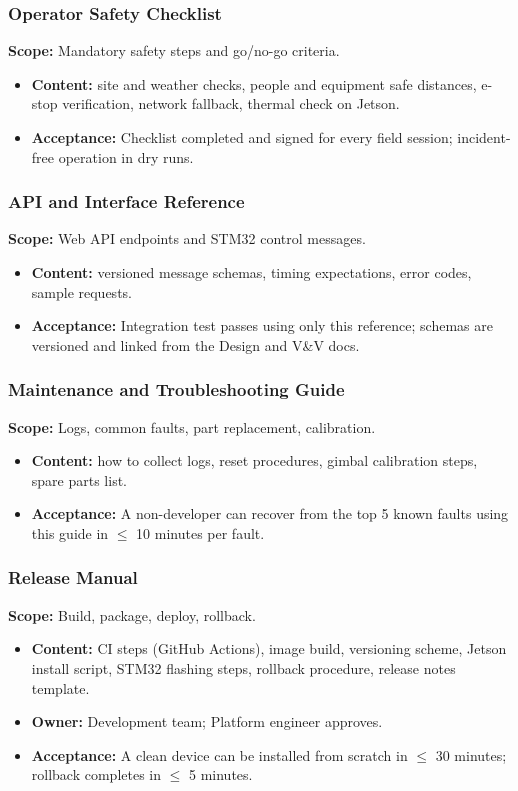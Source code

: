 \documentclass[12pt]{article}
\begin{document}
\subsubsection{Operator Safety Checklist}
\textbf{Scope:} Mandatory safety steps and go/no-go criteria.
\begin{itemize}
  \item \textbf{Content:} site and weather checks, people and equipment safe distances, e-stop verification, network fallback, thermal check on Jetson.
  \item \textbf{Acceptance:} Checklist completed and signed for every field session; incident-free operation in dry runs.
\end{itemize}

\subsubsection{API and Interface Reference}
\textbf{Scope:} Web API endpoints and STM32 control messages.
\begin{itemize}
  \item \textbf{Content:} versioned message schemas, timing expectations, error codes, sample requests.
  \item \textbf{Acceptance:} Integration test passes using only this reference; schemas are versioned and linked from the Design and V\&V docs.
\end{itemize}

\subsubsection{Maintenance and Troubleshooting Guide}
\textbf{Scope:} Logs, common faults, part replacement, calibration.
\begin{itemize}
  \item \textbf{Content:} how to collect logs, reset procedures, gimbal calibration steps, spare parts list.
  \item \textbf{Acceptance:} A non-developer can recover from the top 5 known faults using this guide in $\leq$ 10 minutes per fault.
\end{itemize}

\subsubsection{Release Manual}
\textbf{Scope:} Build, package, deploy, rollback.
\begin{itemize}
  \item \textbf{Content:} CI steps (GitHub Actions), image build, versioning scheme, Jetson install script, STM32 flashing steps, rollback procedure, release notes template.
  \item \textbf{Owner:} Development team; Platform engineer approves.
  \item \textbf{Acceptance:} A clean device can be installed from scratch in $\leq$ 30 minutes; rollback completes in $\leq$ 5 minutes.
\end{itemize}
\end{document}
